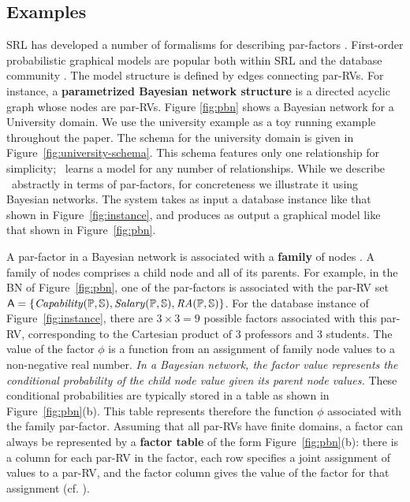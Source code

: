 \documentclass{IEEEtran}
\begin{document}
\subsection{Examples} \label{sec:examples} SRL has developed a number of formalisms for describing par-factors \cite{Kimmig2015}. 
First-order probabilistic graphical models
are popular both within SRL and the database community \cite{Kimmig2015,Wang2008}. The model structure is defined by edges connecting par-RVs. For instance, a \textbf{parametrized Bayesian network structure} is a directed acyclic graph whose nodes are par-RVs.  Figure \ref{fig:pbn} shows a Bayesian network for a University domain. We use the university example as a toy running example throughout the paper. The schema for the university domain is given in Figure~\ref{fig:university-schema}. This schema features only one relationship for simplicity; \FB\ learns a model for any number of relationships. While we describe \FB\ abstractly in terms of par-factors, for concreteness we illustrate it using Bayesian networks. The system takes as input a database instance like that shown in Figure~\ref{fig:instance}, and produces as output a graphical model like that shown in Figure~\ref{fig:pbn}.  


A par-factor in a Bayesian network is associated with a \textbf{family} of nodes \cite[Sec.2.2.1]{Kimmig2015}. A family of nodes comprises a child node and all of its parents. For example, in the BN of Figure~\ref{fig:pbn}, one of the par-factors is associated with the par-RV set $\mathsf{A}=\{\it{Capability}(\mathbb{P},\mathbb{S}),\it{Salary}(\mathbb{P},\mathbb{S}),\it{RA}(\mathbb{P},\mathbb{S})\}$. For the database instance of Figure~\ref{fig:instance}, there are $3\times3=9$ possible factors associated with this par-RV, corresponding to the Cartesian product of 3 professors and 3 students. The value of the factor $\phi$ is a function from an assignment of family node values to a non-negative real number. {\em In a Bayesian network, the factor value represents the conditional probability of the child node value given its parent node values.} These conditional probabilities are typically stored in a table as shown in Figure~\ref{fig:pbn}(b). This table represents therefore the function $\phi$ associated with the family par-factor. Assuming that all par-RVs have finite domains, a factor can always be represented by a \textbf{factor table} of the form Figure~\ref{fig:pbn}(b): there is a column for each par-RV in the factor, each row specifies a joint assignment of values to a par-RV, and the factor column gives the value of the factor for that assignment (cf. \cite[Sec.2.2.1]{Kimmig2015}).
\end{document}

